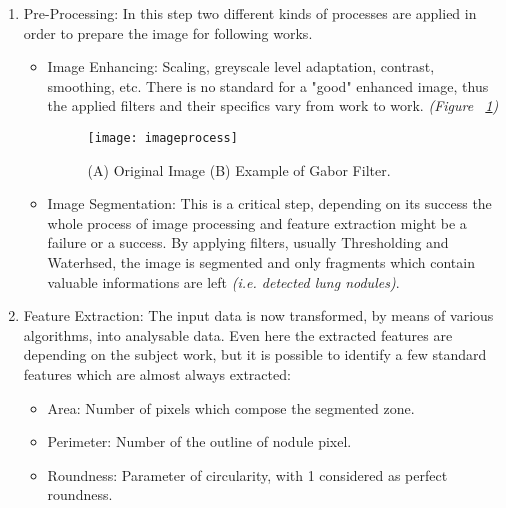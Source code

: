\documentclass[../main.tex]{subfiles}
\begin{document}
\begin{enumerate}
	\item Pre-Processing: In this step two different kinds of processes are applied in order to prepare the image for following works.
	\begin{itemize}
		\item Image Enhancing: Scaling, greyscale level adaptation, contrast, smoothing, etc. There is no standard for a "good" enhanced image, thus the applied filters and their specifics vary from work to work. \textit{(Figure ~\ref{imageprocess})}
		
\begin{figure}[!b]
\centering
\texttt{[image: imageprocess]}
\caption{(A) Original Image (B) Example of Gabor Filter. \cite{Chaudhary2012}}
\label{imageprocess}
\end{figure}
		
		
		\item Image Segmentation: This is a critical step, depending on its success the whole process of image processing and feature extraction might be a failure or a success. By applying filters, usually Thresholding and Waterhsed, the image is segmented and only fragments which contain valuable informations are left \textit{(i.e. detected lung nodules)}.
	\end{itemize}
	\item Feature Extraction: The input data is now transformed, by means of various algorithms, into analysable data. Even here the extracted features are depending on the subject work, but it is possible to identify a few standard features which are almost always extracted:
	\begin{itemize}
		\item Area: Number of pixels which compose the segmented zone.
		\item Perimeter: Number of the outline of nodule pixel.
		\item Roundness: Parameter of circularity, with 1 considered as perfect roundness.
	\end{itemize}
\end{enumerate}
\end{document}
